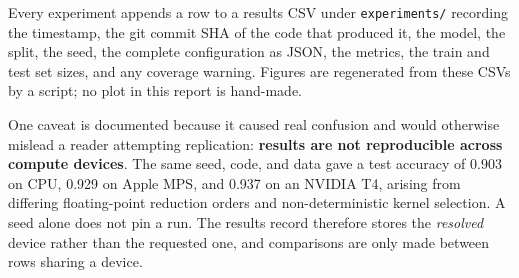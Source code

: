 Every experiment appends a row to a results CSV under \texttt{experiments/}
recording the timestamp, the git commit SHA of the code that produced it,
the model, the split, the seed, the complete configuration as JSON, the
metrics, the train and test set sizes, and any coverage warning. Figures are
regenerated from these CSVs by a script; no plot in this report is
hand-made.

One caveat is documented because it caused real confusion and would
otherwise mislead a reader attempting replication: \textbf{results are not
reproducible across compute devices}. The same seed, code, and data gave a
test accuracy of 0.903 on CPU, 0.929 on Apple MPS, and 0.937 on an NVIDIA
T4, arising from differing floating-point reduction orders and non-deterministic
kernel selection. A seed alone does not pin a run. The results record
therefore stores the \emph{resolved} device rather than the requested one,
and comparisons are only made between rows sharing a device.
